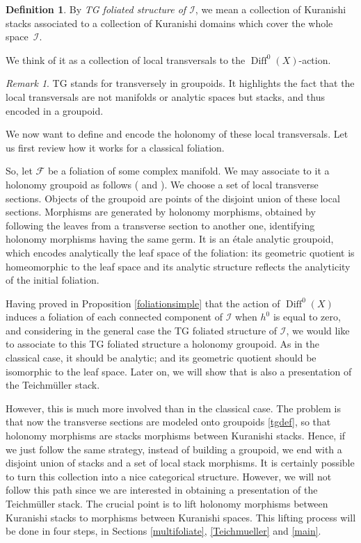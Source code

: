 \documentclass[10pt]{amsart}
\let\mathcal\mathscr
\DeclareMathOperator{\Diff}{Diff}
\theoremstyle{plain}
\theoremstyle{definition}
\newtheorem{definition}[theorem]{Definition}
\theoremstyle{remark}
\newtheorem{remark}[theorem]{Remark}
\numberwithin{equation}{section}
\newcommand{\D}{\Diff^0(X)}
\newcommand{\cI}{\mathcal{I}}
\begin{document}
\begin{definition}
\label{tgfoldef}
By \emph{TG foliated structure of $\cI$}, we mean a collection of Kuranishi stacks associated to a collection of Kuranishi domains which cover the whole space~$\cI$.
\end{definition}
We think of it as a collection of local transversals to the $\D$-action.

\begin{remark}
\label{rkTG}
TG stands for transversely in groupoids. It highlights the fact that the local transversals are not manifolds or analytic spaces but stacks, and thus encoded in a groupoid.
\end{remark}

We now want to define and encode the holonomy of these local transversals. Let us first review how it works for a classical foliation.

So, let $\mathcal F$ be a foliation of some complex manifold. We may associate to it a holonomy groupoid as follows (\cite[\S 5.2]{Moerdijk} and \cite{Ha}). We choose a set of local transverse sections. Objects of the groupoid are points of the disjoint union of these local sections. Morphisms are generated by holonomy morphisms, obtained by following the leaves from a transverse section to another one, identifying holonomy morphisms having the same germ. It is an étale analytic groupoid, which encodes analytically the leaf space of the foliation: its geometric quotient is homeomorphic to the leaf space and its analytic structure reflects the analyticity of the initial foliation.

Having proved in Proposition \ref{foliationsimple} that the action of $\Diff^0(X)$ induces a foliation of each connected component of $\cI$ when $h^0$ is equal to zero, and considering in the general case the TG foliated structure of $\cI$, we would like to associate to this TG foliated structure a holonomy groupoid. As in the classical case, it should be analytic; and its geometric quotient should be isomorphic to the leaf space. Later on, we will show that is also a presentation of the Teichmüller stack.

However, this is much more involved than in the classical case. The problem is that now the transverse sections are modeled onto groupoids \eqref{tgdef}, so that holonomy morphisms are stacks morphisms between Kuranishi stacks. Hence, if we just follow the same strategy, instead of building a groupoid, we end with a disjoint union of stacks and a set of local stack morphisms. It is certainly possible to turn this collection into a nice categorical structure. However, we will not follow this path since we are interested in obtaining a presentation of the Teichmüller stack. The crucial point is to lift holonomy morphisms between Kuranishi stacks to morphisms between Kuranishi spaces. This lifting process will be done in four steps, in Sections \ref{multifoliate}, \ref{Teichmueller} and \ref{main}.
\end{document}
